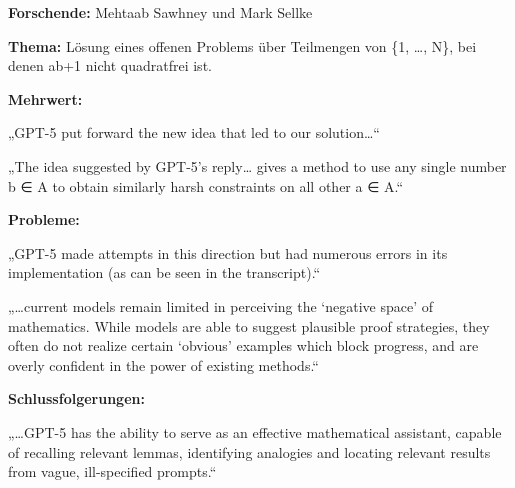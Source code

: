 \documentclass[
  ngerman,
  letterpaper,
  DIV=11]{scrreprt}
\begin{document}
\begin{tcolorbox}[enhanced jigsaw, left=2mm, bottomrule=.15mm, arc=.35mm, rightrule=.15mm, colframe=quarto-callout-note-color-frame, coltitle=black, colback=white, toprule=.15mm, toptitle=1mm, colbacktitle=quarto-callout-note-color!10!white, title=\textcolor{quarto-callout-note-color}{\faInfo}\hspace{0.5em}{Mathematik / Neue Resultate zum Erdős-Problem \#848}, opacitybacktitle=0.6, leftrule=.75mm, bottomtitle=1mm, titlerule=0mm, opacityback=0, breakable]

\textbf{Forschende:} Mehtaab Sawhney und Mark Sellke

\textbf{Thema:} Lösung eines offenen Problems über Teilmengen von \{1,
\ldots, N\}, bei denen ab+1 nicht quadratfrei ist.

\textbf{Mehrwert:}

„GPT-5 put forward the new idea that led to our solution\ldots``

„The idea suggested by GPT-5's reply\ldots{} gives a method to use any
single number b ∈ A to obtain similarly harsh constraints on all other a
∈ A.``

\textbf{Probleme:}

„GPT-5 made attempts in this direction but had numerous errors in its
implementation (as can be seen in the transcript).``

„\ldots current models remain limited in perceiving the `negative space'
of mathematics. While models are able to suggest plausible proof
strategies, they often do not realize certain `obvious' examples which
block progress, and are overly confident in the power of existing
methods.``

\textbf{Schlussfolgerungen:}

„\ldots GPT-5 has the ability to serve as an effective mathematical
assistant, capable of recalling relevant lemmas, identifying analogies
and locating relevant results from vague, ill-specified prompts.``

\end{tcolorbox}
\end{document}
